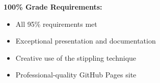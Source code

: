 \documentclass[
  letterpaper,
  DIV=11,
  numbers=noendperiod]{scrartcl}
\providecommand{\tightlist}{%
  \setlength{\itemsep}{0pt}\setlength{\parskip}{0pt}}
\begin{document}
\textbf{100\% Grade Requirements:}

\begin{itemize}
\tightlist
\item[$\square$]
  All 95\% requirements met
\item[$\square$]
  Exceptional presentation and documentation
\item[$\square$]
  Creative use of the stippling technique
\item[$\square$]
  Professional-quality GitHub Pages site
\end{itemize}
\end{document}
